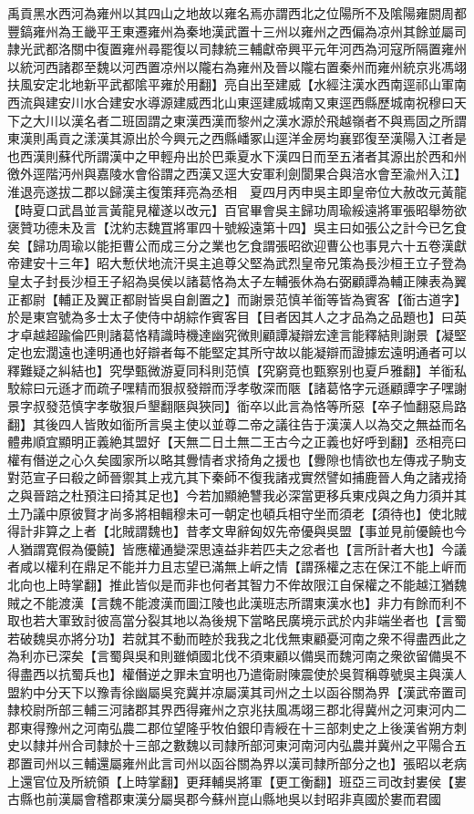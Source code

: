禹貢黑水西河為雍州以其四山之地故以雍名焉亦謂西北之位陽所不及隂陽雍閼周都豐鎬雍州為王畿平王東遷雍州為秦地漢武置十三州以雍州之西偏為凉州其餘並屬司隷光武都洛關中復置雍州尋罷復以司隸統三輔獻帝興平元年河西為河寇所隔置雍州以統河西諸郡至魏以河西置凉州以隴右為雍州及晉以隴右置秦州而雍州統京兆馮翊扶風安定北地新平武都隂平雍於用翻】亮自出至建威【水經注漢水西南逕祁山軍南西流與建安川水合建安水導源建威西北山東逕建威城南又東逕西縣歷城南祝穆曰天下之大川以漢名者二班固謂之東漢西漢而黎州之漢水源於飛越嶺者不與焉固之所謂東漢則禹貢之漾漢其源出於今興元之西縣嶓冢山逕洋金房均襄郢復至漢陽入江者是也西漢則蘇代所謂漢中之甲輕舟出於巴乘夏水下漢四日而至五渚者其源出於西和州徼外逕階沔州與嘉陵水會俗謂之西漢又逕大安軍利劍閬果合與涪水會至渝州入江】淮退亮遂拔二郡以歸漢主復策拜亮為丞相　夏四月丙申吳主即皇帝位大赦改元黃龍【時夏口武昌並言黃龍見權遂以改元】百官畢會吳主歸功周瑜綏遠將軍張昭舉笏欲褒贊功德未及言【沈約志魏罝將軍四十號綏遠第十四】吳主曰如張公之計今已乞食矣【歸功周瑜以能拒曹公而成三分之業也乞食謂張昭欲迎曹公也事見六十五卷漢獻帝建安十三年】昭大慙伏地流汗吳主追尊父堅為武烈皇帝兄策為長沙桓王立子登為皇太子封長沙桓王子紹為吳侯以諸葛恪為太子左輔張休為右弼顧譚為輔正陳表為翼正都尉【輔正及翼正都尉皆吳自創置之】而謝景范慎羊衜等皆為賓客【衜古道字】於是東宫號為多士太子使侍中胡綜作賓客目【目者因其人之才品為之品題也】曰英才卓越超踰倫匹則諸葛恪精識時機達幽究微則顧譚凝辯宏達言能釋結則謝景【凝堅定也宏濶遠也達明通也好辯者每不能堅定其所守故以能凝辯而證據宏遠明通者可以釋難疑之糾結也】究學甄微游夏同科則范慎【究窮竟也甄察别也夏戶雅翻】羊衜私駮綜曰元遜才而疏子嘿精而狠叔發辯而浮孝敬深而陿【諸葛恪字元遜顧譚字子嘿謝景字叔發范慎字孝敬狠戶墾翻陿與狹同】衜卒以此言為恪等所惡【卒子恤翻惡烏路翻】其後四人皆敗如衜所言吳主使以並尊二帝之議往告于漢漢人以為交之無益而名體弗順宜顯明正義絶其盟好【天無二日土無二王古今之正義也好呼到翻】丞相亮曰權有僭逆之心久矣國家所以略其釁情者求掎角之援也【釁隙也情欲也左傳戎子駒支對范宣子曰殽之師晉禦其上戎亢其下秦師不復我諸戎實然譬如捕鹿晉人角之諸戎掎之與晉踣之杜預注曰掎其足也】今若加顯絶讐我必深當更移兵東戍與之角力須并其土乃議中原彼賢才尚多將相輯穆未可一朝定也頓兵相守坐而須老【須待也】使北賊得計非算之上者【北賊謂魏也】昔孝文卑辭匈奴先帝優與吳盟【事並見前優饒也今人猶謂寛假為優饒】皆應權通變深思遠益非若匹夫之忿者也【言所計者大也】今議者咸以權利在鼎足不能并力且志望已滿無上㟁之情【謂孫權之志在保江不能上㟁而北向也上時掌翻】推此皆似是而非也何者其智力不侔故限江自保權之不能越江猶魏賊之不能渡漢【言魏不能渡漢而圖江陵也此漢班志所謂東漢水也】非力有餘而利不取也若大軍致討彼高當分裂其地以為後規下當略民廣境示武於内非端坐者也【言蜀若破魏吳亦將分功】若就其不動而睦於我我之北伐無東顧憂河南之衆不得盡西此之為利亦已深矣【言蜀與吳和則雖傾國北伐不須東顧以備吳而魏河南之衆欲留備吳不得盡西以抗蜀兵也】權僭逆之罪未宜明也乃遣衛尉陳震使於吳賀稱尊號吳主與漢人盟約中分天下以豫青徐幽屬吳兖冀并凉屬漢其司州之土以函谷關為界【漢武帝置司隸校尉所部三輔三河諸郡其界西得雍州之京兆扶風馮翊三郡北得冀州之河東河内二郡東得豫州之河南弘農二郡位望隆乎牧伯銀印青綬在十三部刺史之上後漢省朔方刺史以隸并州合司隸於十三部之數魏以司隸所部河東河南河内弘農并冀州之平陽合五郡置司州以三輔還屬雍州此言司州以函谷關為界以漢司隸所部分之也】張昭以老病上還官位及所統領【上時掌翻】更拜輔吳將軍【更工衡翻】班亞三司改封婁侯【婁古縣也前漢屬會稽郡東漢分屬吳郡今蘇州崑山縣地吳以封昭非真國於婁而君國